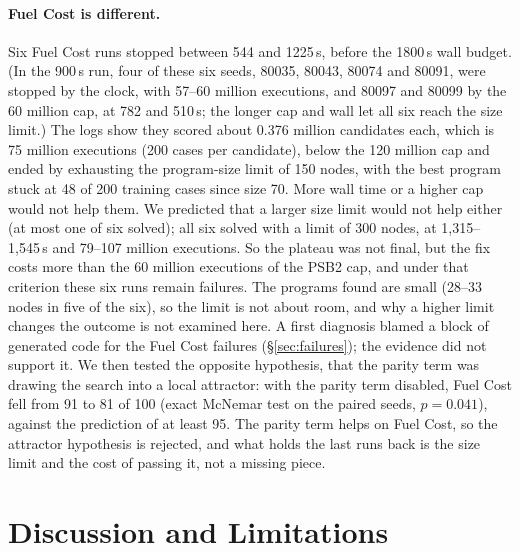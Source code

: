 \documentclass[sigconf,nonacm]{acmart}
\begin{document}
\paragraph{Fuel Cost is different.} Six Fuel Cost runs stopped between 544 and 1225\,s, before the 1800\,s wall budget. (In the 900\,s run, four of these six seeds, 80035, 80043, 80074 and 80091, were stopped by the clock, with 57--60 million executions, and 80097 and 80099 by the 60 million cap, at 782 and 510\,s; the longer cap and wall let all six reach the size limit.) The logs show they scored about 0.376 million candidates each, which is 75 million executions (200 cases per candidate), below the 120 million cap and ended by exhausting the program-size limit of 150 nodes, with the best program stuck at 48 of 200 training cases since size 70. More wall time or a higher cap would not help them. We predicted that a larger size limit would not help either (at most one of six solved); all six solved with a limit of 300 nodes, at 1,315--1,545\,s and 79--107 million executions. So the plateau was not final, but the fix costs more than the 60 million executions of the PSB2 cap, and under that criterion these six runs remain failures. The programs found are small (28--33 nodes in five of the six), so the limit is not about room, and why a higher limit changes the outcome is not examined here. A first diagnosis blamed a
block of generated code for the Fuel Cost failures (\S\ref{sec:failures}); the evidence did not support it. We then tested the opposite
hypothesis, that the parity term was drawing the search into a local attractor: with the parity term disabled, Fuel Cost fell from 91 to 81 of
100 (exact McNemar test on the paired seeds, $p=0.041$), against the prediction of at least 95. The parity term helps on Fuel Cost, so the
attractor hypothesis is rejected, and what holds the last runs back is the size limit and the cost of passing it, not a missing piece.

\section{Discussion and Limitations}
\label{sec:discussion}
\end{document}
